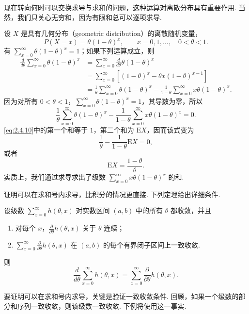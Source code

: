 现在转向何时可以交换求导与求和的问题，这种运算对离散分布具有重要作用. 当然，我们只关心无穷和，因为有限和总可以逐项求导.
\begin{example}[交换求和与求导]\label{ex:2.4.7}
设 $X$ 是具有几何分布（geometric distribution）的离散随机变量，
$$P(X=x)=\theta(1-\theta)^x,\qquad x=0,1,\ldots,\quad0<\theta<1.$$
有 $\sum_{x=0}^\infty\theta(1-\theta)^x=1$；如果下列运算成立，则
$$\begin{aligned}
\frac d{d\theta}\sum_{x=0}^\infty\theta(1-\theta)^x
&=\sum_{x=0}^\infty\frac d{d\theta}\theta(1-\theta)^x\\
&=\sum_{x=0}^\infty[(1-\theta)^x-\theta x(1-\theta)^{x-1}]\\
&=\frac1\theta\sum_{x=0}^\infty\theta(1-\theta)^x
-\frac1{1-\theta}\sum_{x=0}^\infty x\theta(1-\theta)^x.
\end{aligned}$$
因为对所有 $0<\theta<1$，$\sum_{x=0}^\infty\theta(1-\theta)^x=1$，其导数为零，所以
\begin{equation}\label{eq:2.4.10}
\frac1\theta\sum_{x=0}^\infty\theta(1-\theta)^x
-\frac1{1-\theta}\sum_{x=0}^\infty x\theta(1-\theta)^x=0.
\end{equation}
\eqref{eq:2.4.10}中的第一个和等于 $1$，第二个和为 $\mathrm EX$，因而该式变为
$$\frac1\theta-\frac1{1-\theta}\mathrm EX=0,$$
或者
$$\mathrm EX=\frac{1-\theta}\theta.$$
实质上，我们通过求导求出了级数 $\sum_{x=0}^\infty x\theta(1-\theta)^x$ 的和.
\end{example}

证明可以在求和号内求导，比积分的情况更直接. 下列定理给出详细条件.
\begin{theorem}\label{thm:2.4.8}
设级数 $\sum_{x=0}^\infty h(\theta,x)$ 对实数区间 $(a,b)$ 中的所有 $\theta$ 都收敛，并且
\begin{enumerate}
\item[(i)] 对每个 $x$，$\frac\partial{\partial\theta}h(\theta,x)$ 关于 $\theta$ 连续；
\item[(ii)] $\sum_{x=0}^\infty\frac\partial{\partial\theta}h(\theta,x)$ 在 $(a,b)$ 的每个有界闭子区间上一致收敛.
\end{enumerate}
则
\begin{equation}\label{eq:2.4.11}
\frac d{d\theta}\sum_{x=0}^\infty h(\theta,x)
=\sum_{x=0}^\infty\frac\partial{\partial\theta}h(\theta,x).
\end{equation}
\end{theorem}
要证明可以在求和号内求导，关键是验证一致收敛条件. 回顾，如果一个级数的部分和序列一致收敛，则该级数一致收敛. 下例将使用这一事实.

